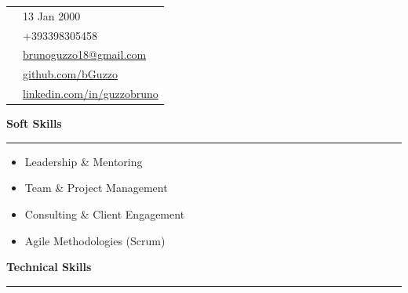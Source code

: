 \documentclass[9pt, a4paper]{article}
\newcommand{\cvsection}[1]{%
	\vspace{2pt}\par
	{\Large\bfseries\color{sectionblue}#1}\par
	\vspace{2pt}\hrule\vspace{6pt}
}
\begin{document}
	\begin{minipage}[t]{0.32\linewidth}
		\vspace{0pt} %
		
		\begin{center}
		\end{center}
		
		\begin{tabularx}{\linewidth}{@{}lX@{}}
			\faBirthdayCake & 13 Jan 2000 \\
			\faPhone & +393398305458 \\
			\faEnvelope & \href{mailto:brunoguzzo18@gmail.com}{brunoguzzo18@gmail.com} \\
			\faGithub & \href{https://github.com/bGuzzo}{github.com/bGuzzo} \\
			\faLinkedin & \href{https://www.linkedin.com/in/guzzobruno/}{linkedin.com/in/guzzobruno} \\
		\end{tabularx}
		\vspace{4pt}
		
		\cvsection{Soft Skills}
		\begin{itemize}[leftmargin=*, nosep, itemsep=2pt]
			\footnotesize
			\item Leadership \& Mentoring
			\item Team \& Project Management
			\item Consulting \& Client Engagement
			\item Agile Methodologies (Scrum)
		\end{itemize}
		\vspace{5pt}
		
		\cvsection{Technical Skills}
		

\end{minipage}
\end{document}
